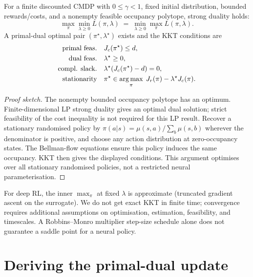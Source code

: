 \documentclass[11pt,oneside]{scrbook}
\begin{document}
\begin{theorem}\label{thm:strong-dual}
For a finite discounted CMDP with $0\leq\gamma<1$, fixed initial distribution, bounded rewards/costs, and a nonempty feasible occupancy polytope, strong duality holds:
\[
   \max_\pi \min_{\lambda \geq 0} L(\pi, \lambda) \;=\; \min_{\lambda \geq 0} \max_\pi L(\pi, \lambda).
\]
A primal-dual optimal pair $(\pi^\star, \lambda^\star)$ exists and the KKT
conditions are
\[
\begin{aligned}
   \text{primal feas.}\quad & J_c(\pi^\star) \leq d, \\
   \text{dual feas.}\quad & \lambda^\star \geq 0, \\
   \text{compl. slack.}\quad & \lambda^\star (J_c(\pi^\star) - d) = 0, \\
   \text{stationarity}\quad & \pi^\star \in \operatorname*{arg\,max}_\pi \; J_r(\pi) - \lambda^\star J_c(\pi).
\end{aligned}
\]
\end{theorem}

\begin{proof}[Proof sketch]
The nonempty bounded occupancy polytope has an optimum. Finite-dimensional
LP strong duality gives an optimal dual solution; strict feasibility of the
cost inequality is not required for this LP result. Recover a stationary
randomised policy by $\pi(a|s)=\mu(s,a)/\sum_b\mu(s,b)$ wherever the denominator
is positive, and choose any action distribution at zero-occupancy states.
The Bellman-flow equations ensure this policy induces the same occupancy.
KKT then gives the displayed conditions. This argument optimises over all
stationary randomised policies, not a restricted neural parameterisation.

\end{proof}

\begin{remark}
For deep RL, the inner $\max_\pi$ at fixed $\lambda$ is approximate (truncated
gradient ascent on the surrogate). We do not get exact KKT in finite time;
convergence requires additional assumptions on optimisation, estimation,
feasibility, and timescales. A Robbins--Monro multiplier step-size schedule
alone does not guarantee a saddle point for a neural policy.
\end{remark}

\section{Deriving the primal-dual update}
\end{document}
